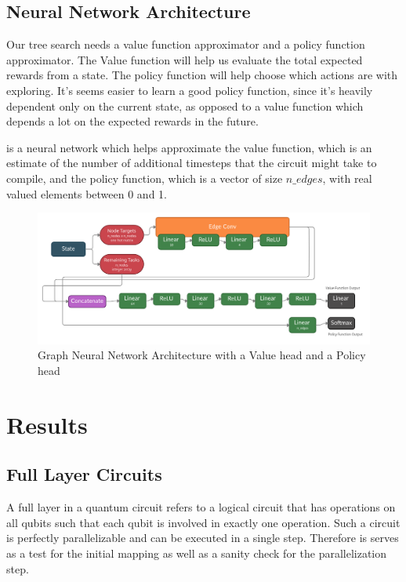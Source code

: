 \documentclass[%
 reprint,
 amsmath,amssymb,
 aps,
]{revtex4-2}
\begin{document}
\subsection{\label{sec:method-architecture}Neural Network Architecture}

Our tree search needs a value function approximator and a policy function approximator. The Value function will help us evaluate the total expected rewards from a state. The policy function will help choose which actions are with exploring. It's seems easier to learn a good policy function, since it's heavily dependent only on the current state, as opposed to a value function which depends a lot on the expected rewards in the future.

is a neural network which helps approximate the value function, which is an estimate of the number of additional timesteps that the circuit might take to compile, and the policy function, which is a vector of size $n\_edges$, with real valued elements between 0 and 1.

\begin{figure}[t]
    \includegraphics[width=\textwidth]{images/network-architecture.jpg}
    \caption{\label{fig:network-architecture}
        Graph Neural Network Architecture with a Value head and a Policy head}
\end{figure}


\section{\label{sec:results}Results}

\subsection{\label{sec:results-full}Full Layer Circuits}

A full layer in a quantum circuit refers to a logical circuit that has operations on all qubits such that each qubit is involved in exactly one operation. Such a circuit is perfectly parallelizable and can be executed in a single step. Therefore is serves as a test for the initial mapping as well as a sanity check for the parallelization step.
\end{document}
